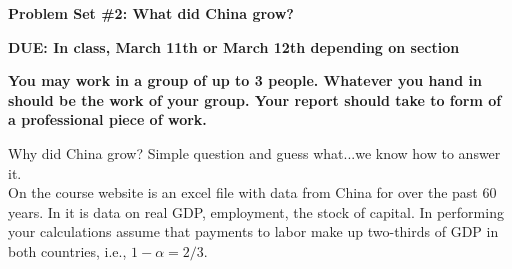 \documentclass[11pt,pdftex,twoside,letterpaper]{exam}
\begin{document}
\centerline{}
\smallskip
\centerline{\Large \bf Problem Set \#2: What did China grow?}
\vspace{3mm}
\centerline{\bf DUE: In class, March 11th or March 12th depending on section}
\medskip
{\bf You may work in a group of up to 3 people. Whatever you hand in should be the work of your
group. Your report should take to form of a professional piece of work.}


\begin{questions}

\question Why did China grow? Simple question and guess what...we know how to answer it.\\ 

On the course website is an excel file with data from China for over the past 60 years. In it is data on real GDP, employment, the stock of capital. In performing your calculations assume that payments to labor make up two-thirds of GDP in both countries, i.e., $1-\alpha=2/3$.

\medskip

\end{questions}
\end{document}
